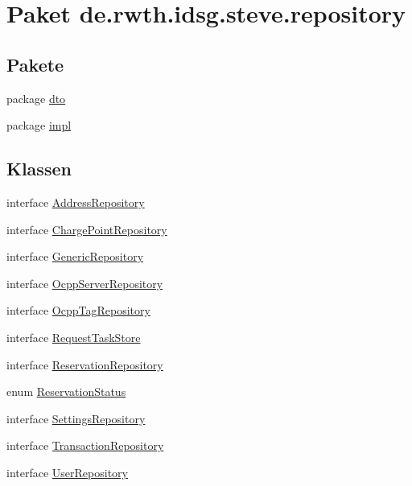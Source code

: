 \hypertarget{namespacede_1_1rwth_1_1idsg_1_1steve_1_1repository}{\section{Paket de.\+rwth.\+idsg.\+steve.\+repository}
\label{namespacede_1_1rwth_1_1idsg_1_1steve_1_1repository}
}
\subsection*{Pakete}
\begin{DoxyCompactItemize}
\item 
package \hyperlink{namespacede_1_1rwth_1_1idsg_1_1steve_1_1repository_1_1dto}{dto}
\item 
package \hyperlink{namespacede_1_1rwth_1_1idsg_1_1steve_1_1repository_1_1impl}{impl}
\end{DoxyCompactItemize}
\subsection*{Klassen}
\begin{DoxyCompactItemize}
\item 
interface \hyperlink{interfacede_1_1rwth_1_1idsg_1_1steve_1_1repository_1_1_address_repository}{Address\+Repository}
\item 
interface \hyperlink{interfacede_1_1rwth_1_1idsg_1_1steve_1_1repository_1_1_charge_point_repository}{Charge\+Point\+Repository}
\item 
interface \hyperlink{interfacede_1_1rwth_1_1idsg_1_1steve_1_1repository_1_1_generic_repository}{Generic\+Repository}
\item 
interface \hyperlink{interfacede_1_1rwth_1_1idsg_1_1steve_1_1repository_1_1_ocpp_server_repository}{Ocpp\+Server\+Repository}
\item 
interface \hyperlink{interfacede_1_1rwth_1_1idsg_1_1steve_1_1repository_1_1_ocpp_tag_repository}{Ocpp\+Tag\+Repository}
\item 
interface \hyperlink{interfacede_1_1rwth_1_1idsg_1_1steve_1_1repository_1_1_request_task_store}{Request\+Task\+Store}
\item 
interface \hyperlink{interfacede_1_1rwth_1_1idsg_1_1steve_1_1repository_1_1_reservation_repository}{Reservation\+Repository}
\item 
enum \hyperlink{enumde_1_1rwth_1_1idsg_1_1steve_1_1repository_1_1_reservation_status}{Reservation\+Status}
\item 
interface \hyperlink{interfacede_1_1rwth_1_1idsg_1_1steve_1_1repository_1_1_settings_repository}{Settings\+Repository}
\item 
interface \hyperlink{interfacede_1_1rwth_1_1idsg_1_1steve_1_1repository_1_1_transaction_repository}{Transaction\+Repository}
\item 
interface \hyperlink{interfacede_1_1rwth_1_1idsg_1_1steve_1_1repository_1_1_user_repository}{User\+Repository}
\end{DoxyCompactItemize}
